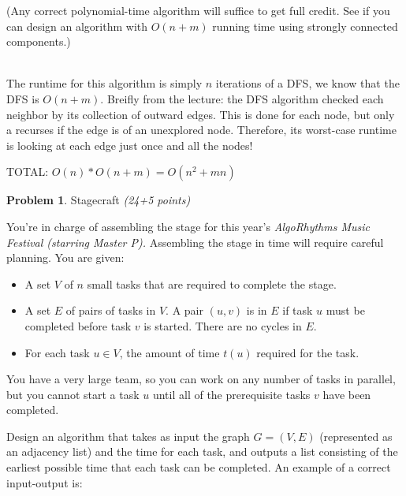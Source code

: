 \documentclass[11pt]{article}
\theoremstyle{definition}
\theoremstyle{theorem}
\newtheorem{prob}{Problem}
\newcommand{\solution}{\medskip\noindent{\color{DarkBlue}\textbf{Solution:}}}
\begin{document}
\begin{enumerate}[label=(\alph*)]
\begin{enumerate}[label=(\roman*)]
    (Any correct polynomial-time algorithm will suffice to get full
    credit.  See if you can design an algorithm with $O(n + m)$
    running time using strongly connected components.)

\solution \\

The runtime for this algorithm is simply $n$ iterations of a DFS, we know that the DFS is $O(n + m)$.
Breifly from the lecture: the DFS algorithm checked each neighbor by its collection of outward edges.
This is done for each node, but only a recurses if the edge is of an unexplored node. 
Therefore, its worst-case runtime is looking at each edge just once and all the nodes!

TOTAL: $O(n) * O(n + m) = O(n^2 + mn)$

  \end{enumerate}
\end{enumerate}

\newpage



\begin{prob}Stagecraft  \emph{(24+5 points)}\end{prob}

You're in charge of assembling the stage for this year's \emph{AlgoRhythms Music Festival (starring Master P).}  Assembling the stage in time will require careful planning.  You are given:
\begin{itemize}
\item A set $V$ of $n$ small tasks that are required to complete the stage.
\item A set $E$ of pairs of tasks in $V$. A pair $(u,v)$ is in $E$ if task $u$ must be completed before task $v$ is started. There are no cycles in $E.$
\item For each task $u \in V$, the amount of time $t(u)$ required for the task.
\end{itemize}
You have a very large team, so you can work on any number of tasks in parallel, but you cannot start a task $u$ until all of the prerequisite tasks $v$ have been completed.

Design an algorithm that takes as input the graph $G = (V,E)$ (represented as an adjacency list) and the time for each task, and outputs a list consisting of the earliest possible time that each task can be completed.  An example of a correct input-output is:
\end{document}
